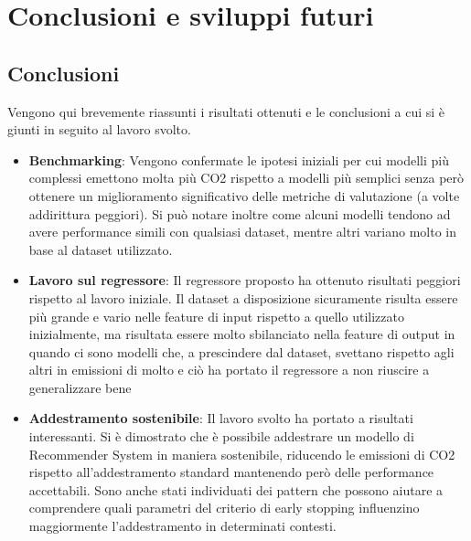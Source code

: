 \section{Conclusioni e sviluppi futuri}
\subsection{Conclusioni}
Vengono qui brevemente riassunti i risultati ottenuti e le conclusioni a cui si è giunti in seguito al lavoro svolto.
\begin{itemize}
    \item \textbf{Benchmarking}: Vengono confermate le ipotesi iniziali per cui modelli più complessi emettono molta più CO2 rispetto a modelli più semplici senza però ottenere un miglioramento significativo delle metriche di valutazione (a volte addirittura peggiori). Si può notare inoltre come alcuni modelli tendono ad avere performance simili con qualsiasi dataset, mentre altri variano molto in base al dataset utilizzato.
    \item \textbf{Lavoro sul regressore}: Il regressore proposto ha ottenuto risultati peggiori rispetto al lavoro iniziale. Il dataset a disposizione sicuramente risulta essere più grande e vario nelle feature di input rispetto a quello utilizzato inizialmente, ma risultata essere molto sbilanciato nella feature di output in quando ci sono modelli che, a prescindere dal dataset, svettano rispetto agli altri in emissioni di molto e ciò ha portato il regressore a non riuscire a generalizzare bene
    \item \textbf{Addestramento sostenibile}: Il lavoro svolto ha portato a risultati interessanti. Si è dimostrato che è possibile addestrare un modello di Recommender System in maniera sostenibile, riducendo le emissioni di CO2 rispetto all'addestramento standard mantenendo però delle performance accettabili. Sono anche stati individuati dei pattern che possono aiutare a comprendere quali parametri del criterio di early stopping influenzino maggiormente l'addestramento in determinati contesti.
\end{itemize}

